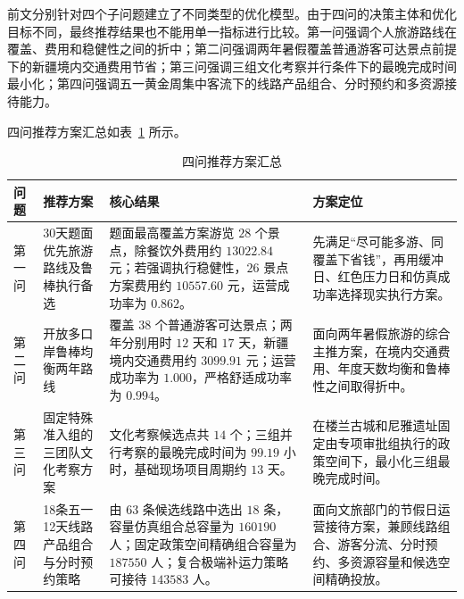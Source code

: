 \documentclass[UTF8,zihao=-4,a4paper]{ctexart}
\begin{document}
前文分别针对四个子问题建立了不同类型的优化模型。由于四问的决策主体和优化目标不同，最终推荐结果也不能用单一指标进行比较。第一问强调个人旅游路线在覆盖、费用和稳健性之间的折中；第二问强调两年暑假覆盖普通游客可达景点前提下的新疆境内交通费用节省；第三问强调三组文化考察并行条件下的最晚完成时间最小化；第四问强调五一黄金周集中客流下的线路产品组合、分时预约和多资源接待能力。

四问推荐方案汇总如表~\ref{tab:overall_recommendations} 所示。

\begin{table}[htbp]
    \centering
    \caption{四问推荐方案汇总}
    \label{tab:overall_recommendations}
    \small
    \renewcommand{\arraystretch}{1.20}
    \setlength{\tabcolsep}{4pt}
    \begin{tabularx}{\textwidth}{
        >{\centering\arraybackslash}p{1.4cm}
        p{3.4cm}
        X
        p{3.6cm}
    }
        \toprule
        问题 & 推荐方案 & 核心结果 & 方案定位 \\
        \midrule
        第一问
        & 30天题面优先旅游路线及鲁棒执行备选
        & 题面最高覆盖方案游览 $28$ 个景点，除餐饮外费用约 $13022.84$ 元；若强调执行稳健性，$26$ 景点方案费用约 $10557.60$ 元，运营成功率为 $0.862$。
        & 先满足“尽可能多游、同覆盖下省钱”，再用缓冲日、红色压力日和仿真成功率选择现实执行方案。 \\

        第二问
        & 开放多口岸鲁棒均衡两年路线
        & 覆盖 $38$ 个普通游客可达景点；两年分别用时 $12$ 天和 $17$ 天，新疆境内交通费用约 $3099.91$ 元；运营成功率为 $1.000$，严格舒适成功率为 $0.994$。
        & 面向两年暑假旅游的综合主推方案，在境内交通费用、年度天数均衡和鲁棒性之间取得折中。 \\

        第三问
        & 固定特殊准入组的三团队文化考察方案
        & 文化考察候选点共 $14$ 个；三组并行考察的最晚完成时间为 $99.19$ 小时，基础现场项目周期约 $13$ 天。
        & 在楼兰古城和尼雅遗址固定由专项审批组执行的政策空间下，最小化三组最晚完成时间。 \\

        第四问
        & 18条五一12天线路产品组合与分时预约策略
        & 由 $63$ 条候选线路中选出 $18$ 条，容量仿真组合总容量为 $160190$ 人；固定政策空间精确组合容量为 $187550$ 人；复合极端补运力策略可接待 $143583$ 人。
        & 面向文旅部门的节假日运营接待方案，兼顾线路组合、游客分流、分时预约、多资源容量和候选空间精确投放。 \\
        \bottomrule
    \end{tabularx}
\end{table}
\end{document}
